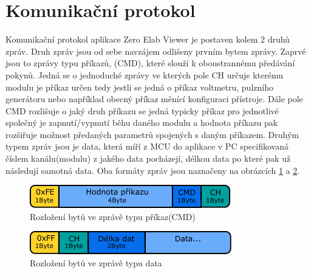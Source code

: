 \section{Komunikační protokol}
Komunikační protokol aplikace Zero Elab Viewer je postaven kolem 2 druhů zpráv. Druh zpráv jsou od sebe navzájem odlišeny prvním bytem zprávy. Zaprvé jsou to zprávy typu příkazů, (CMD), které slouží k oboustrannému předávání pokynů. Jedná se o jednoduché zprávy ve kterých pole CH určuje kterému modulu je příkaz určen tedy jestli se jedná o příkaz voltmetru, pulzního generátoru nebo například obecný příkaz měnící konfiguraci přístroje. Dále pole CMD rozlišuje o jaký druh příkazu se jedná typicky příkaz pro jednotlivé společný je zapnutí/vypnutí běhu daného modulu a hodnota příkazu pak rozšiřuje možnost předaných parametrů spojených s daným příkazem. Druhým typem zpráv jsou je data, která míří z MCU do aplikace v PC specifikovaná číslem kanálu(modulu) z jakého data pocházejí, délkou data po které pak už následují samotná data. Oba formáty zpráv jsou naznačeny na obrázcích \ref{fig:communicationcmd} a \ref{fig:communicationdata}. 
 
\begin{figure}[H]
	\centering
	\includegraphics[width=0.7\linewidth]{Figs/Diagrams/SVG/CommunicationCMD.pdf}
	\caption{Rozložení bytů ve zprávě typu příkaz(CMD)}
	\label{fig:communicationcmd}
\end{figure}

\begin{figure}[H]
	\centering
	\includegraphics[width=0.7\linewidth]{Figs/Diagrams/SVG/CommunicationDATA.pdf}
	\caption{Rozložení bytů ve zprávě typu data}
	\label{fig:communicationdata}
\end{figure}

